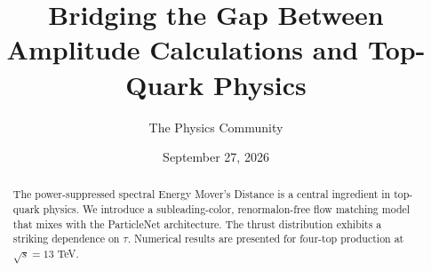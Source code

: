\documentclass[11pt]{article}
\title{Bridging the Gap Between Amplitude Calculations and Top-Quark Physics}
\author{The Physics Community}
\date{September 27, 2026}
\begin{document}
\maketitle
\begin{abstract}
The power-suppressed spectral Energy Mover's Distance is a central
ingredient in top-quark physics. We introduce a subleading-color,
renormalon-free flow matching model that mixes with the ParticleNet
architecture. The thrust distribution exhibits a striking dependence on
$\tau$. Numerical results are presented for four-top production at
$\sqrt{s} = 13$ TeV.
\end{abstract}
\tableofcontents



\nocite{*}


\end{document}
